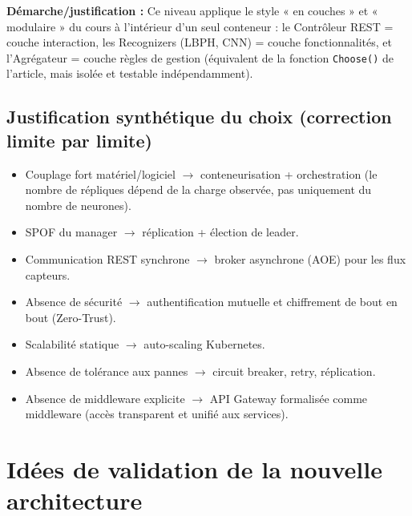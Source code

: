 \documentclass[11pt,a4paper]{article}
\newcommand{\demarche}[1]{\par\noindent\textbf{Démarche/justification :} #1\par}
\begin{document}
\demarche{Ce niveau applique le style « en couches » et « modulaire » du cours à l'intérieur d'un seul conteneur : le Contrôleur REST = couche interaction, les Recognizers (LBPH, CNN) = couche fonctionnalités, et l'Agrégateur = couche règles de gestion (équivalent de la fonction \texttt{Choose()} de l'article, mais isolée et testable indépendamment).}


\subsection{Justification synthétique du choix (correction limite par limite)}
\begin{itemize}
\item Couplage fort matériel/logiciel $\rightarrow$ conteneurisation + orchestration (le nombre de répliques dépend de la charge observée, pas uniquement du nombre de neurones).
\item SPOF du manager $\rightarrow$ réplication + élection de leader.
\item Communication REST synchrone $\rightarrow$ broker asynchrone (AOE) pour les flux capteurs.
\item Absence de sécurité $\rightarrow$ authentification mutuelle et chiffrement de bout en bout (Zero-Trust).
\item Scalabilité statique $\rightarrow$ auto-scaling Kubernetes.
\item Absence de tolérance aux pannes $\rightarrow$ circuit breaker, retry, réplication.
\item Absence de middleware explicite $\rightarrow$ API Gateway formalisée comme middleware (accès transparent et unifié aux services).
\end{itemize}

\newpage
\section{Idées de validation de la nouvelle architecture}
\end{document}
